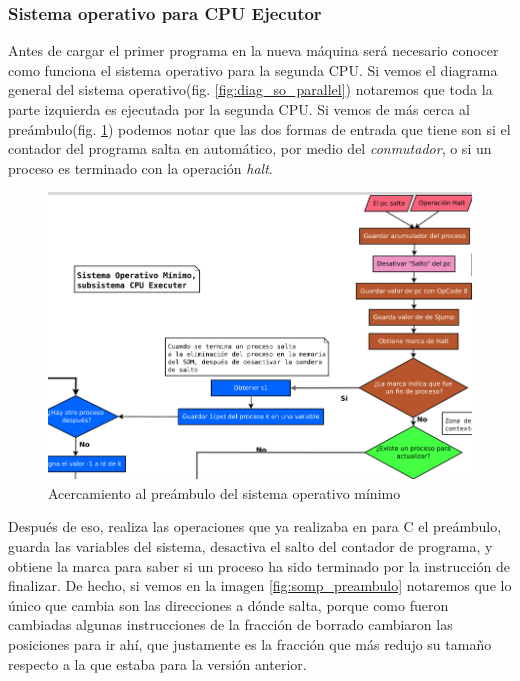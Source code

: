 \documentclass[letterpaper,12pt,oneside]{book}
\begin{document}
			
			
			\subsubsection{Sistema operativo para CPU Ejecutor}
			
				Antes de cargar el primer programa en la nueva máquina será necesario conocer  como funciona el sistema operativo para la
				segunda CPU. Si vemos el diagrama general del sistema operativo(fig. \ref{fig:diag_so_parallel}) notaremos que toda la parte izquierda
				es ejecutada por la segunda CPU. Si vemos de más cerca al preámbulo(fig. \ref{fig:diag_so_paralel_cpue}) podemos notar que las
				dos formas de entrada que tiene son si el contador del programa salta en automático, por medio del \textit{conmutador}, o si
				un proceso es terminado con la operación \textit{halt}. 

			
			
			\begin{figure}[h]		
				\centering
				\includegraphics[scale=0.5]{media/Paralela/diag_so_paralel_cpue.png}
				\caption{ Acercamiento al preámbulo del sistema operativo mínimo}
				\label{fig:diag_so_paralel_cpue}
			\end{figure}	
			

				Después de eso, realiza las operaciones que ya realizaba en para C el preámbulo, guarda las variables del sistema, desactiva
				el salto del contador de programa, y obtiene la marca para saber si un proceso ha sido terminado por la instrucción de finalizar. De hecho,
				si vemos en la imagen \ref{fig:somp_preambulo} notaremos que lo único que cambia son las direcciones a dónde salta, porque como fueron
				cambiadas algunas instrucciones de la fracción de borrado cambiaron las posiciones para ir ahí, que justamente es la fracción que más redujo su tamaño
				respecto a la que estaba para la versión anterior.
			
\end{document}

